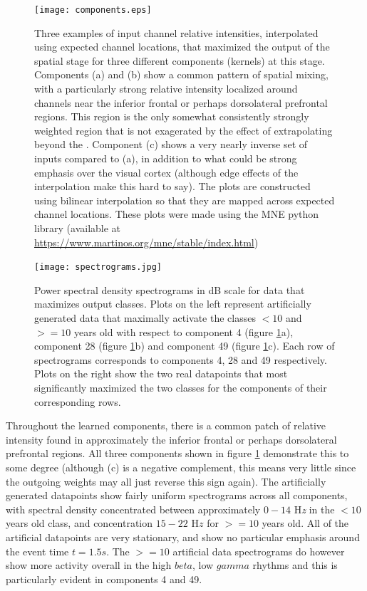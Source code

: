 \documentclass[fleqn,10pt]{wlscirep}
\begin{document}
\begin{figure}[h!]
  \centering\texttt{[image: components.eps]}
  \caption[textfind]{Three examples of input channel relative intensities, interpolated using expected channel locations, that maximized the output of the spatial stage for three different components (kernels) at this stage. Components (a) and (b) show a common pattern of spatial mixing, with a particularly strong relative intensity localized around channels near the inferior frontal or perhaps dorsolateral prefrontal regions. This region is the only somewhat consistently strongly weighted region that is not exagerated by the effect of extrapolating beyond the . Component (c) shows a very nearly inverse set of inputs compared to (a), in addition to what could be strong emphasis over the visual cortex (although edge effects of the interpolation make this hard to say). The plots are constructed using bilinear interpolation so that they are mapped across expected channel locations. These plots were made using the MNE python library (available at \url{https://www.martinos.org/mne/stable/index.html})}
  \label{fig:max_components}
\end{figure}


\begin{figure}[ht]
  \caption{Power spectral density spectrograms in dB scale for data that maximizes output classes. Plots on the left represent artificially generated data that maximally activate the classes $<10$ and $>=10$ years old with respect to component 4 (figure \ref{fig:max_components}a), component 28 (figure \ref{fig:max_components}b) and component 49 (figure \ref{fig:max_components}c). Each row of spectrograms corresponds to components 4, 28 and 49 respectively. Plots on the right show the two real datapoints that most significantly maximized the two classes for the components of their corresponding rows.}
  \centering\texttt{[image: spectrograms.jpg]}
 \label{fig:max_spectrograms}
\end{figure}

Throughout the learned components, there is a common patch of relative intensity found in approximately the inferior frontal or perhaps dorsolateral prefrontal regions. All three components shown in figure \ref{fig:max_components} demonstrate this to some degree (although (c) is a negative complement, this means very little since the outgoing weights may all just reverse this sign again). The artificially generated datapoints show fairly uniform spectrograms across all components, with spectral density concentrated between approximately $0-14$ H{\em z} in the $<10$ years old class, and concentration $15-22$ H$z$ for $>=10$ years old. All of the artificial datapoints are very stationary, and show no particular emphasis around the event time $t=1.5s$. The $>=10$ artificial data spectrograms do however show more activity overall in the high $beta$, low $gamma$ rhythms and this is particularly evident in components 4 and 49.
\end{document}
